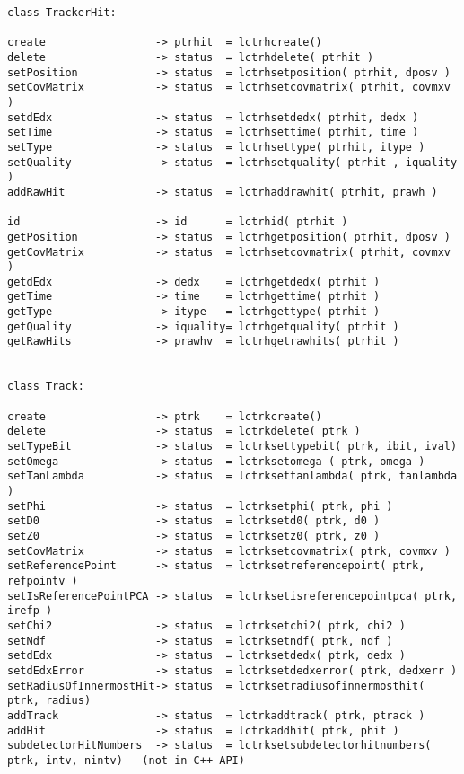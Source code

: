 \begin{scriptsize}
\begin{verbatim}
class TrackerHit:

create                 -> ptrhit  = lctrhcreate()
delete                 -> status  = lctrhdelete( ptrhit )
setPosition            -> status  = lctrhsetposition( ptrhit, dposv )
setCovMatrix           -> status  = lctrhsetcovmatrix( ptrhit, covmxv )
setdEdx                -> status  = lctrhsetdedx( ptrhit, dedx )
setTime                -> status  = lctrhsettime( ptrhit, time )
setType                -> status  = lctrhsettype( ptrhit, itype )
setQuality             -> status  = lctrhsetquality( ptrhit , iquality )
addRawHit              -> status  = lctrhaddrawhit( ptrhit, prawh )

id                     -> id      = lctrhid( ptrhit )
getPosition            -> status  = lctrhgetposition( ptrhit, dposv )
getCovMatrix           -> status  = lctrhsetcovmatrix( ptrhit, covmxv )
getdEdx                -> dedx    = lctrhgetdedx( ptrhit )
getTime                -> time    = lctrhgettime( ptrhit )
getType                -> itype   = lctrhgettype( ptrhit )
getQuality             -> iquality= lctrhgetquality( ptrhit )
getRawHits             -> prawhv  = lctrhgetrawhits( ptrhit )


class Track:

create                 -> ptrk    = lctrkcreate()
delete                 -> status  = lctrkdelete( ptrk )
setTypeBit             -> status  = lctrksettypebit( ptrk, ibit, ival)
setOmega               -> status  = lctrksetomega ( ptrk, omega )
setTanLambda           -> status  = lctrksettanlambda( ptrk, tanlambda )
setPhi                 -> status  = lctrksetphi( ptrk, phi )
setD0                  -> status  = lctrksetd0( ptrk, d0 )
setZ0                  -> status  = lctrksetz0( ptrk, z0 )
setCovMatrix           -> status  = lctrksetcovmatrix( ptrk, covmxv )
setReferencePoint      -> status  = lctrksetreferencepoint( ptrk, refpointv )
setIsReferencePointPCA -> status  = lctrksetisreferencepointpca( ptrk, irefp )
setChi2                -> status  = lctrksetchi2( ptrk, chi2 )
setNdf                 -> status  = lctrksetndf( ptrk, ndf )
setdEdx                -> status  = lctrksetdedx( ptrk, dedx )
setdEdxError           -> status  = lctrksetdedxerror( ptrk, dedxerr )
setRadiusOfInnermostHit-> status  = lctrksetradiusofinnermosthit( ptrk, radius)
addTrack               -> status  = lctrkaddtrack( ptrk, ptrack )
addHit                 -> status  = lctrkaddhit( ptrk, phit )
subdetectorHitNumbers  -> status  = lctrksetsubdetectorhitnumbers( ptrk, intv, nintv)   (not in C++ API)


\end{verbatim}
\end{scriptsize}
